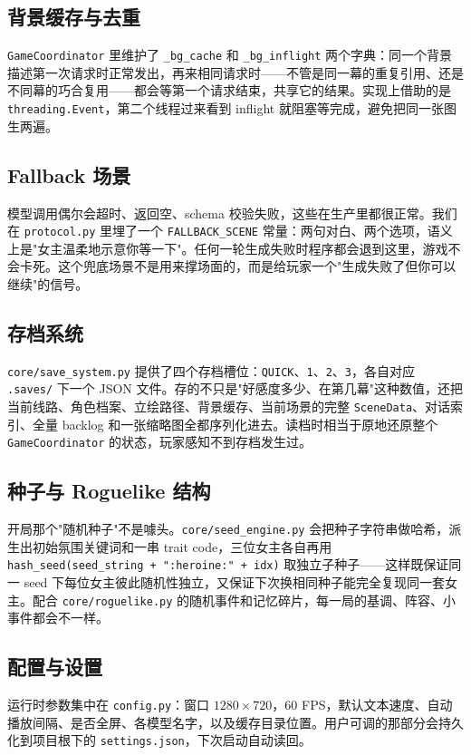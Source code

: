 \documentclass[12pt,a4paper]{article}
\newcommand{\brk}{\discretionary{}{}{}}
\begin{document}
\subsection{背景缓存与去重}
\texttt{GameCoordinator} 里维护了 \texttt{\_bg\_cache} 和 \texttt{\_bg\_inflight} 两个字典：同一个背景描述第一次请求时正常发出，再来相同请求时——不管是同一幕的重复引用、还是不同幕的巧合复用——都会等第一个请求结束，共享它的结果。实现上借助的是 \texttt{threading.Event}，第二个线程过来看到 inflight 就阻塞等完成，避免把同一张图生两遍。

\subsection{Fallback 场景}
模型调用偶尔会超时、返回空、schema 校验失败，这些在生产里都很正常。我们在 \texttt{protocol.py} 里埋了一个 \texttt{FALLBACK\_SCENE} 常量：两句对白、两个选项，语义上是"女主温柔地示意你等一下"。任何一轮生成失败时程序都会退到这里，游戏不会卡死。这个兜底场景不是用来撑场面的，而是给玩家一个"生成失败了但你可以继续"的信号。

\subsection{存档系统}
\texttt{core/save\_system.py} 提供了四个存档槽位：\texttt{QUICK}、\texttt{1}、\texttt{2}、\texttt{3}，各自对应 \texttt{.saves/} 下一个 JSON 文件。存的不只是"好感度多少、在第几幕"这种数值，还把当前线路、角色档案、立绘路径、背景缓存、当前场景的完整 \texttt{SceneData}、对话索引、全量 backlog 和一张缩略图全都序列化进去。读档时相当于原地还原整个 \texttt{GameCoordinator} 的状态，玩家感知不到存档发生过。

\subsection{种子与 Roguelike 结构}
开局那个"随机种子"不是噱头。\texttt{core/\brk seed\_engine.py} 会把种子字符串做哈希，派生出初始氛围关键词和一串 trait code，三位女主各自再用 \texttt{hash\_seed(\brk seed\_string\brk\ +\ ":heroine:"\ +\ idx)} 取独立子种子——这样既保证同一 seed 下每位女主彼此随机性独立，又保证下次换相同种子能完全复现同一套女主。配合 \texttt{core/roguelike.py} 的随机事件和记忆碎片，每一局的基调、阵容、小事件都会不一样。

\subsection{配置与设置}
运行时参数集中在 \texttt{config.py}：窗口 $1280 \times 720$，60 FPS，默认文本速度、自动播放间隔、是否全屏、各模型名字，以及缓存目录位置。用户可调的那部分会持久化到项目根下的 \texttt{settings.json}，下次启动自动读回。
\end{document}
